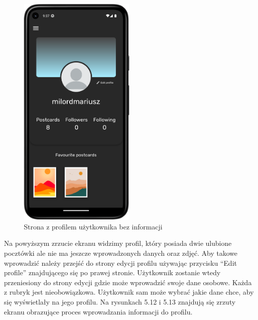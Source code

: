 \documentclass[a4paper,twoside,12pt]{book}
\begin{document}
\begin{figure}[H]
    \centering
    \includegraphics[width=0.5\textwidth]{mobile_ss/profil_bez_info.png}
    \caption{Strona z profilem użytkownika bez informacji}
\end{figure}

Na powyższym zrzucie ekranu widzimy profil, który posiada dwie ulubione pocztówki ale nie ma jeszcze wprowadzonych danych oraz zdjęć. Aby takowe wprowadzić należy przejść do strony edycji profilu używając przycisku ``Edit profile'' znajdującego się po prawej stronie. Użytkownik zostanie wtedy przeniesiony do strony edycji gdzie może wprowadzić swoje dane osobowe. Każda z rubryk jest nieobowiązkowa. Użytkownik sam może wybrać jakie dane chce, aby się wyświetlały na jego profilu. Na rysunkach 5.12 i 5.13 znajdują się zrzuty ekranu obrazujące proces wprowadzania informacji do profilu.
\end{document}
